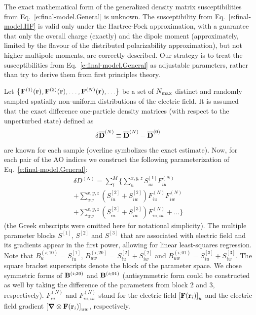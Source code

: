 \documentclass[aip,amsmath,amssymb,reprint,floatfix]{revtex4-1}
\newcommand{\BM}[1]{\bm{#1}}
\begin{document}
The exact mathematical form of the generalized density matrix susceptibilities 
from Eq.~\eqref{e:final-model.General} is unknown. 
The susceptibility from Eq.~\eqref{e:final-model.HF} is valid only under the Hartree\hyp{}Fock
approximation, with a guarantee that only the overall charge (exactly) and the dipole moment (approximately,
limited by the flavour of the distributed polarizability approximation), 
but not higher multipole moments, are correctly described.
Our strategy is to treat the susceptibilities from Eq.~\eqref{e:final-model.General}
as adjustable parameters, rather than try to derive them from first principles theory.

Let  
$\left\{ {\bf F}^{(1)}({\bf r}), {\bf F}^{(2)}({\bf r}), \ldots, {\bf F}^{(N)}({\bf r}), \ldots \right\}$ 
be a set of $N_{\rm max}$ distinct and randomly sampled 
spatially non\hyp{}uniform distributions of the electric field. It is assumed that
the exact difference one\hyp{}particle density matrices (with respect to the unperturbed state)
defined as
%
\begin{equation}
 \delta \overline{\bf D}^{(N)} \equiv \overline{\bf D}^{(N)} - \overline{\bf D}^{(0)}
\end{equation}
%
are known for each sample (overline symbolizes the exact estimate).
Now, for each pair of the AO indices we construct the following 
parameterization of Eq.~\eqref{e:final-model.General}:
%
\begin{multline}\label{e:final-model.General.Parameters}
 \delta D^{(N)} = \sum_{i }^M \Big\{ 
                              \sum_u^{x,y,z} S^{[1]}_{iu} F_{iu}^{(N)} \\
                +             \sum_{uw}^{x,y,z} \left( S^{[2]}_{iu} + S^{[2]}_{iw} \right) F_{iu}^{(N)} F_{iw}^{(N)} \\
                +             \sum_{uw}^{x,y,z} \left( S^{[3]}_{iu} + S^{[3]}_{iw}\right) F_{iu,iw}^{(N)}
                        + \ldots \Big\}
\end{multline}
%
(the Greek subscripts were omitted here for notational simplicity).
The multiple parameter blocks 
$S^{[1]}$, $S^{[2]}$ and $S^{[3]}$ that are associated with electric field and its gradients
appear in the first power, allowing for linear least\hyp{}squares regression.
Note that $B_u^{(i;10)} = S^{[1]}_{iu}$, $B_{uw}^{(i;20)} = S^{[2]}_{iu} + S^{[2]}_{iw}$
and $B_{uw}^{(i;01)} = S^{[3]}_{iu} + S^{[3]}_{iw}$. The square bracket superscripts 
denote the block of the parameter space. We chose symmetric forms of ${\bf B}^{(i;20)}$
and ${\bf B}^{(i;01)}$ (antisymmetric form could be constructed as well by taking the difference
of the parameters from block 2 and 3, respectively). $F_{iu}^{(N)}$ and $F_{iu,iw}^{(N)}$ 
stand for the electric field $\left[ {\bf F}({\bf r}_i)\right]_u$ and the electric field
gradient $\left[ {\BM \nabla} \otimes {\bf F}({\bf r}_i) \right]_{uw}$, respectively.
\end{document}
